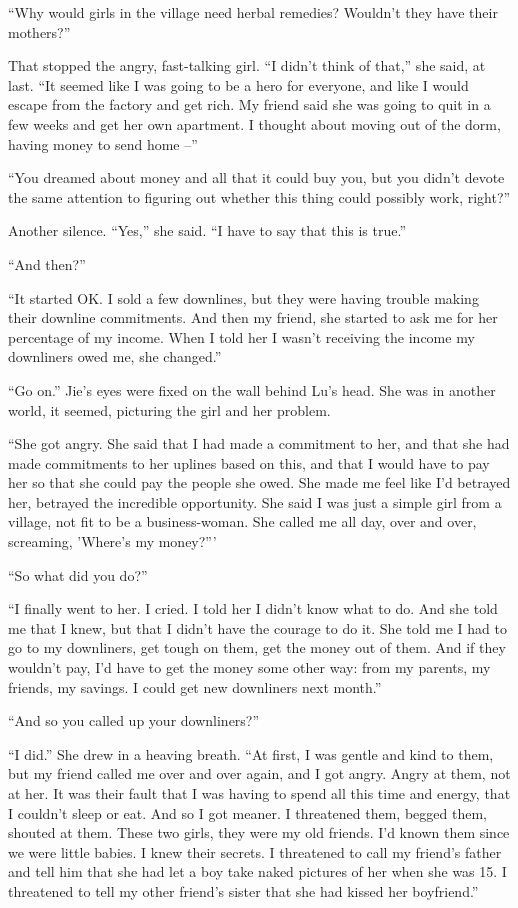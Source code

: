 ``Why would girls in the village need herbal remedies? Wouldn't they
have their mothers?''

That stopped the angry, fast-talking girl. ``I didn't think of
that,'' she said, at last. ``It seemed like I was going to be a hero
for everyone, and like I would escape from the factory and get
rich. My friend said she was going to quit in a few weeks and get
her own apartment. I thought about moving out of the dorm, having
money to send home --''

``You dreamed about money and all that it could buy you, but you
didn't devote the same attention to figuring out whether this thing
could possibly work, right?''

Another silence. ``Yes,'' she said. ``I have to say that this is
true.''

``And then?''

``It started OK. I sold a few downlines, but they were having
trouble making their downline commitments. And then my friend, she
started to ask me for her percentage of my income. When I told her
I wasn't receiving the income my downliners owed me, she changed.''

``Go on.'' Jie's eyes were fixed on the wall behind Lu's head. She
was in another world, it seemed, picturing the girl and her
problem.

``She got angry. She said that I had made a commitment to her, and
that she had made commitments to her uplines based on this, and
that I would have to pay her so that she could pay the people she
owed. She made me feel like I'd betrayed her, betrayed the
incredible opportunity. She said I was just a simple girl from a
village, not fit to be a business-woman. She called me all day,
over and over, screaming, 'Where's my money?'''

``So what did you do?''

``I finally went to her. I cried. I told her I didn't know what to
do. And she told me that I knew, but that I didn't have the courage
to do it. She told me I had to go to my downliners, get tough on
them, get the money out of them. And if they wouldn't pay, I'd have
to get the money some other way: from my parents, my friends, my
savings. I could get new downliners next month.''

``And so you called up your downliners?''

``I did.'' She drew in a heaving breath. ``At first, I was gentle and
kind to them, but my friend called me over and over again, and I
got angry. Angry at them, not at her. It was their fault that I was
having to spend all this time and energy, that I couldn't sleep or
eat. And so I got meaner. I threatened them, begged them, shouted
at them. These two girls, they were my old friends. I'd known them
since we were little babies. I knew their secrets. I threatened to
call my friend's father and tell him that she had let a boy take
naked pictures of her when she was 15. I threatened to tell my
other friend's sister that she had kissed her boyfriend.''

